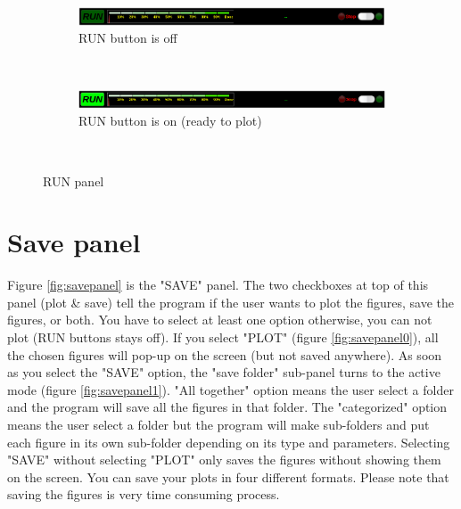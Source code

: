 \documentclass[11pt,a4paper,titlepage]{report}
\begin{document}
\begin{figure}[H]
    \centering
    \begin{subfigure}[H]{0.5\textwidth}
        \includegraphics[width=\textwidth]{run1.png}
        \caption{RUN button is off}
        \label{fig:runpanel0} 
    \end{subfigure}\\
    \begin{subfigure}[H]{0.5\textwidth}
        \includegraphics[width=\textwidth]{run2.png}
        \caption{RUN button is on (ready to plot)}
        \label{fig:runpanel1} 
    \end{subfigure}\\
    \caption[RUN panel]{RUN panel}
    \label{fig:runpanel}    
\end{figure}

\section{Save panel}
Figure \ref{fig:savepanel} is the "SAVE" panel. The two checkboxes at top of this panel (plot \& save) tell the program if the user wants to plot the figures, save the figures, or both. You have to select at least one option otherwise, you can not plot (RUN buttons stays off). If you select "PLOT" (figure \ref{fig:savepanel0}), all the chosen figures will pop-up on the screen (but not saved anywhere). As soon as you select the "SAVE" option, the "save folder" sub-panel turns to the active mode (figure \ref{fig:savepanel1}). "All together" option means the user select a folder and the program will save all the figures in that folder. The "categorized" option means the user select a folder but the program will make sub-folders and put each figure in its own sub-folder depending on its type and parameters. Selecting "SAVE" without selecting "PLOT" only saves the figures without showing them on the screen. You can save your plots in four different formats. Please note that saving the figures is very time consuming process.
\end{document}
